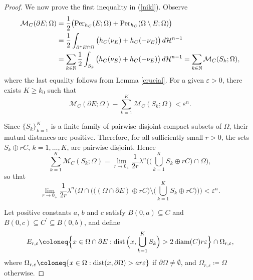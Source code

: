 \documentclass[pdflatex,sn-mathphys-num]{sn-jnl}
\theoremstyle{plain}
\theoremstyle{definition}
\DeclareMathOperator{\dist}{\textup{dist}}
\DeclareMathOperator{\diam}{\textup{diam}}
\begin{document}
\begin{proof}
We now prove the first inequality in (\ref{nikl}). Observe
\begin{equation*}
\begin{split}
\mathcal{M}_C(\partial E; \Omega)&=\frac{1}{2}\big(\textup{Per}_{h_{C}}(E; \Omega)+\textup{Per}_{h_{C}}(\Omega\setminus E; \Omega)\big)\\
&=\frac{1}{2}\int_{\partial^* E\cap\Omega}\big(h_C(\nu_E)+h_C(-\nu_E)\big)\,d\mathcal{H}^{n-1}\\
&=\sum_{k\in\mathbb{N}}\frac{1}{2}\int_{S_k}\big(h_C(\nu_E)+h_C(-\nu_E)\big)\,d\mathcal{H}^{n-1}=\sum_{k\in\mathbb{N}}\mathcal{M}_C(S_k; \Omega),
\end{split}
\end{equation*}
where the last equality follows from Lemma \ref{crucial}. For a given $\varepsilon>0$, there exists $K\geq k_0$ such that
\[
\mathcal{M}_C(\partial E; \Omega)-\sum_{k=1}^K\mathcal{M}_C(S_k; \Omega)<\varepsilon^{n}.
\]

Since $\{S_k\}_{k=1}^K$ is a finite family of pairwise disjoint compact subsets of $\Omega$, their mutual distances are positive. Therefore, for all sufficiently small $r>0$, the sets $S_k\oplus rC$, $k=1,\dots,K$, are pairwise disjoint. Hence
\begin{equation*}
\sum_{k=1}^K\mathcal{M}_C(S_k; \Omega)=\lim_{r\to0_+}\frac{1}{2r}\lambda^n\bigg(\Big(\bigcup_{k=1}^K S_k\oplus rC\Big)\cap\Omega\bigg),
\end{equation*}
so that
\begin{equation}\label{rum}
\lim_{r\to0_+}\frac{1}{2r}\lambda^n\Bigg(\Omega\cap\bigg(\Big((\Omega\cap\partial E)\oplus rC\Big)\setminus\Big(\bigcup_{k=1}^K S_k\oplus rC\Big)\bigg)\Bigg)<\varepsilon^n.
\end{equation}

Let positive constants $a$, $b$ and $c$ satisfy $B(0,a)\subseteq C$ and $B(0, c)\subseteq C^{\prime}\subseteq B(0,b)$, and define
\[
E_{r, \varepsilon}\coloneq \Big\{x\in \Omega\cap\partial E  : \dist\Big(x, \bigcup_{k=1}^K S_k\Big)>2\diam(C)r\varepsilon \Big\}\cap\Omega_{r, \varepsilon},
\]
where $\Omega_{r, \varepsilon}\coloneq \{x\in\Omega : \dist(x, \partial\Omega)>ar\varepsilon\}$ if $\partial\Omega\neq\emptyset$, and $\Omega_{r, \varepsilon}\coloneq \Omega$ otherwise. %


\end{proof}
\end{document}
